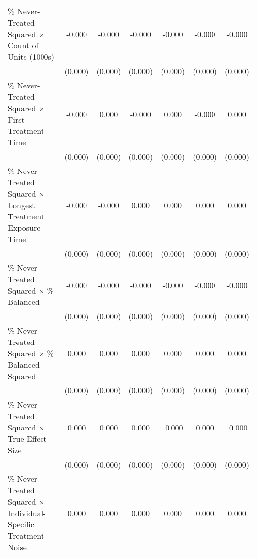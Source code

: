 \begin{table}[htbp]
\begin{tabular}{l*{6}{c}}
\% Never-Treated Squared $\times$ Count of Units (1000s)&      -0.000\sym{***}&      -0.000\sym{**} &      -0.000\sym{**} &      -0.000\sym{*}  &      -0.000\sym{**} &      -0.000         \\
                    &     (0.000)         &     (0.000)         &     (0.000)         &     (0.000)         &     (0.000)         &     (0.000)         \\
\% Never-Treated Squared $\times$ First Treatment Time&      -0.000         &       0.000         &      -0.000\sym{***}&       0.000\sym{***}&      -0.000\sym{***}&       0.000\sym{***}\\
                    &     (0.000)         &     (0.000)         &     (0.000)         &     (0.000)         &     (0.000)         &     (0.000)         \\
\% Never-Treated Squared $\times$ Longest Treatment Exposure Time&      -0.000\sym{**} &      -0.000\sym{***}&       0.000\sym{***}&       0.000\sym{***}&       0.000\sym{***}&       0.000\sym{***}\\
                    &     (0.000)         &     (0.000)         &     (0.000)         &     (0.000)         &     (0.000)         &     (0.000)         \\
\% Never-Treated Squared $\times$ \% Balanced&      -0.000\sym{***}&      -0.000\sym{***}&      -0.000\sym{***}&      -0.000\sym{***}&      -0.000\sym{***}&      -0.000\sym{***}\\
                    &     (0.000)         &     (0.000)         &     (0.000)         &     (0.000)         &     (0.000)         &     (0.000)         \\
\% Never-Treated Squared $\times$ \% Balanced Squared&       0.000\sym{***}&       0.000\sym{***}&       0.000\sym{***}&       0.000\sym{***}&       0.000\sym{***}&       0.000\sym{***}\\
                    &     (0.000)         &     (0.000)         &     (0.000)         &     (0.000)         &     (0.000)         &     (0.000)         \\
\% Never-Treated Squared $\times$ True Effect Size&       0.000         &       0.000         &       0.000         &      -0.000         &       0.000         &      -0.000         \\
                    &     (0.000)         &     (0.000)         &     (0.000)         &     (0.000)         &     (0.000)         &     (0.000)         \\
\% Never-Treated Squared $\times$ Individual-Specific Treatment Noise&       0.000\sym{***}&       0.000\sym{***}&       0.000\sym{***}&       0.000\sym{**} &       0.000\sym{***}&       0.000\sym{**} \\

\end{tabular}
\end{table}
